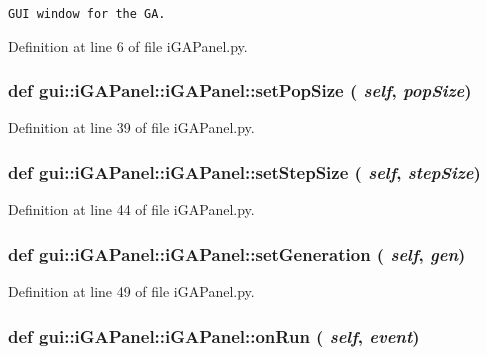 \footnotesize\begin{verbatim}
GUI window for the GA.
\end{verbatim}
\normalsize
 

Definition at line 6 of file iGAPanel.py.
\subsubsection{\setlength{\rightskip}{0pt plus 5cm}def gui::iGAPanel::iGAPanel::setPopSize ( {\em self},  {\em popSize})}\label{classgui_1_1iGAPanel_1_1iGAPanel_41011e6d4eab8df25c77ed2455b872ef}




Definition at line 39 of file iGAPanel.py.
\subsubsection{\setlength{\rightskip}{0pt plus 5cm}def gui::iGAPanel::iGAPanel::setStepSize ( {\em self},  {\em stepSize})}\label{classgui_1_1iGAPanel_1_1iGAPanel_4979c45d2badac7585e1a656a165e55b}




Definition at line 44 of file iGAPanel.py.
\subsubsection{\setlength{\rightskip}{0pt plus 5cm}def gui::iGAPanel::iGAPanel::setGeneration ( {\em self},  {\em gen})}\label{classgui_1_1iGAPanel_1_1iGAPanel_d3562f16e6f864fe029fa0739ba3a5b2}




Definition at line 49 of file iGAPanel.py.
\subsubsection{\setlength{\rightskip}{0pt plus 5cm}def gui::iGAPanel::iGAPanel::onRun ( {\em self},  {\em event})}\label{classgui_1_1iGAPanel_1_1iGAPanel_86d1260373b3ac39920c75455e074bb9}




